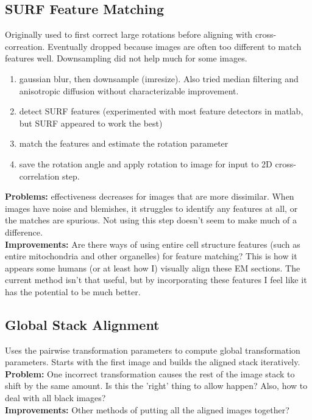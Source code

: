 \documentclass{article}
\begin{document}
\subsection{SURF Feature Matching}
Originally used to first correct large rotations before aligning with cross-correation. Eventually dropped because images are often too different to match features well. Downsampling did not help much for some images.\\
\begin{enumerate}
\item gaussian blur, then downsample (imresize). Also tried median filtering and anisotropic diffusion without characterizable improvement.
\item detect SURF features (experimented with most feature detectors in matlab, but SURF appeared to work the best)
\item match the features and estimate the rotation parameter
\item save the rotation angle and apply rotation to image for input to 2D cross-correlation step.
\end{enumerate}
\textbf{Problems:} effectiveness decreases for images that are more dissimilar. When images have noise and blemishes, it struggles to identify any features at all, or the matches are spurious. Not using this step doesn't seem to make much of a difference. \\
\textbf{Improvements:} Are there ways of using entire cell structure features (such as entire mitochondria and other organelles) for feature matching? This is how it appears some humans (or at least how I) visually align these EM sections. The current method isn't that useful, but by incorporating these features I feel like it has the potential to be much better.


\subsection{Global Stack Alignment}
Uses the pairwise transformation parameters to compute global transformation parameters. Starts with the first image and builds the aligned stack iteratively. \\
\textbf{Problem:} One incorrect transformation causes the rest of the image stack to shift by the same amount. Is this the 'right' thing to allow happen? Also, how to deal with all black images? \\
\textbf{Improvements:} Other methods of putting all the aligned images together?
\end{document}
